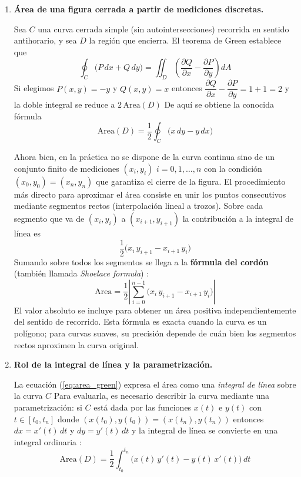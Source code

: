 \documentclass[12pt]{article}
\begin{document}
\begin{enumerate}
	\item \textbf{Área de una figura cerrada a partir de mediciones discretas.}

	Sea $C$ una curva cerrada simple (sin autointersecciones) recorrida en sentido antihorario, y sea $D$ la región que encierra. El teorema de Green establece que \cite{stewart12, mathworld_green}
	\[
	\oint_C \bigl(P\,dx + Q\,dy\bigr) = \iint_D \left(\frac{\partial Q}{\partial x} - \frac{\partial P}{\partial y}\right) dA
	\]
	Si elegimos $P(x,y) = -y$ y $Q(x,y) = x$ entonces $\dfrac{\partial Q}{\partial x} - \dfrac{\partial P}{\partial y} = 1 + 1 = 2$ y la doble integral se reduce a $2\,\text{Area}(D)$ De aquí se obtiene la conocida fórmula
	\begin{equation}\label{eq:area_green}
	\text{Area}(D) = \frac{1}{2}\oint_C \bigl(x\,dy - y\,dx\bigr)
	\end{equation}

	Ahora bien, en la práctica no se dispone de la curva continua sino de un conjunto finito de mediciones $(x_i, y_i)$ $i=0,1,\ldots,n$ con la condición $(x_0,y_0) = (x_n,y_n)$ que garantiza el cierre de la figura. El procedimiento más directo para aproximar el área consiste en unir los puntos consecutivos mediante segmentos rectos (interpolación lineal a trozos). Sobre cada segmento que va de $(x_i, y_i)$ a $(x_{i+1}, y_{i+1})$ la contribución a la integral de línea es
	\[
	\frac{1}{2}\bigl(x_i\,y_{i+1} - x_{i+1}\,y_i\bigr)
	\]
	Sumando sobre todos los segmentos se llega a la \textbf{fórmula del cordón} (también llamada \textit{Shoelace formula}) \cite{mathworld_shoelace}:
	\begin{equation}\label{eq:shoelace}
	\text{Area} = \frac{1}{2}\left|\sum_{i=0}^{n-1}\bigl(x_i\,y_{i+1} - x_{i+1}\,y_i\bigr)\right|
	\end{equation}
	El valor absoluto se incluye para obtener un área positiva independientemente del sentido de recorrido. Esta fórmula es exacta cuando la curva es un polígono; para curvas suaves, su precisión depende de cuán bien los segmentos rectos aproximen la curva original.

	\item \textbf{Rol de la integral de línea y la parametrización.}

	La ecuación (\ref{eq:area_green}) expresa el área como una \textit{integral de línea} sobre la curva $C$ Para evaluarla, es necesario describir la curva mediante una parametrización: si $C$ está dada por las funciones $x(t)$ e $y(t)$ con $t\in[t_0, t_n]$ donde $(x(t_0),y(t_0)) = (x(t_n),y(t_n))$ entonces $dx = x'(t)\,dt$ y $dy = y'(t)\,dt$ y la integral de línea se convierte en una integral ordinaria \cite{stewart12}:
	\begin{equation}\label{eq:area_param}
	\text{Area}(D) = \frac{1}{2}\int_{t_0}^{t_n} \bigl(x(t)\,y'(t) - y(t)\,x'(t)\bigr)\,dt
	\end{equation}


\end{enumerate}
\end{document}
